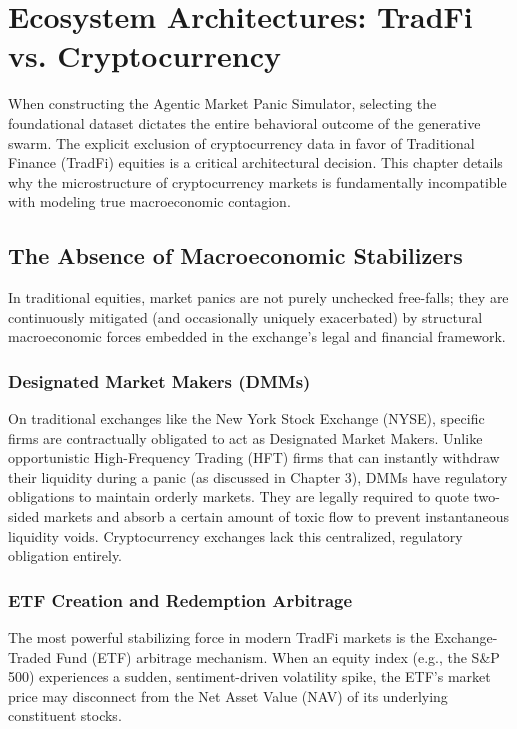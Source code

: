 \chapter[Ecosystem Architectures: TradFi vs. Crypto]{Ecosystem Architectures: TradFi vs. Cryptocurrency}
\label{ch:tradfi_vs_crypto}

When constructing the Agentic Market Panic Simulator, selecting the foundational dataset dictates the entire behavioral outcome of the generative swarm. The explicit exclusion of cryptocurrency data in favor of Traditional Finance (TradFi) equities is a critical architectural decision. This chapter details why the microstructure of cryptocurrency markets is fundamentally incompatible with modeling true macroeconomic contagion.

\section{The Absence of Macroeconomic Stabilizers}

In traditional equities, market panics are not purely unchecked free-falls; they are continuously mitigated (and occasionally uniquely exacerbated) by structural macroeconomic forces embedded in the exchange's legal and financial framework.

\subsection{Designated Market Makers (DMMs)}
On traditional exchanges like the New York Stock Exchange (NYSE), specific firms are contractually obligated to act as Designated Market Makers. Unlike opportunistic High-Frequency Trading (HFT) firms that can instantly withdraw their liquidity during a panic (as discussed in Chapter 3), DMMs have regulatory obligations to maintain orderly markets. They are legally required to quote two-sided markets and absorb a certain amount of toxic flow to prevent instantaneous liquidity voids. Cryptocurrency exchanges lack this centralized, regulatory obligation entirely.

\subsection{ETF Creation and Redemption Arbitrage}
The most powerful stabilizing force in modern TradFi markets is the Exchange-Traded Fund (ETF) arbitrage mechanism. When an equity index (e.g., the S\&P 500) experiences a sudden, sentiment-driven volatility spike, the ETF's market price may disconnect from the Net Asset Value (NAV) of its underlying constituent stocks.

